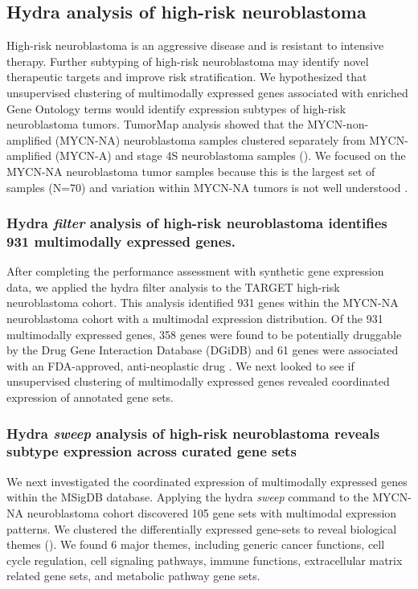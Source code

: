 \documentclass[10pt,letterpaper]{article}
\begin{document}
\subsection*{Hydra analysis of high-risk neuroblastoma}
High-risk neuroblastoma is an aggressive disease and is resistant to intensive therapy. Further subtyping of high-risk neuroblastoma may identify novel therapeutic targets and improve risk stratification. We hypothesized that unsupervised clustering of multimodally expressed genes associated with enriched Gene Ontology terms would identify expression subtypes of high-risk neuroblastoma tumors. TumorMap  analysis \cite{newtonTumorMapExploringMolecular2017} showed that the MYCN-non-amplified (MYCN-NA) neuroblastoma samples clustered separately from MYCN-amplified (MYCN-A) and stage 4S neuroblastoma samples (). We focused on the MYCN-NA neuroblastoma tumor samples because this is the largest set of samples (N=70) and variation within MYCN-NA tumors is not well understood \cite{morgensternChallengeDefiningUltrahighrisk2019}.

\subsubsection*{Hydra \textit{filter} analysis of high-risk neuroblastoma identifies 931 multimodally expressed genes.}
After completing the performance assessment with synthetic gene expression data, we applied the hydra filter analysis to the TARGET high-risk neuroblastoma cohort. This analysis identified 931 genes within the MYCN-NA neuroblastoma cohort with a multimodal expression distribution. Of the 931 multimodally expressed genes, 358 genes were found to be potentially druggable by the Drug Gene Interaction Database (DGiDB) and 61 genes were associated with an FDA-approved, anti-neoplastic drug  \cite{cotto2017dgidb}. We next looked to see if unsupervised clustering of multimodally expressed genes revealed coordinated expression of annotated gene sets.

\subsubsection*{Hydra \textit{sweep} analysis of high-risk neuroblastoma reveals subtype expression across curated gene sets}
We next investigated the coordinated expression of multimodally expressed genes within the MSigDB database. Applying the hydra \textit{sweep} command to the MYCN-NA neuroblastoma cohort discovered 105 gene sets with multimodal expression patterns. We clustered the differentially expressed gene-sets to reveal biological themes (). We found 6 major themes, including generic cancer functions, cell cycle regulation, cell signaling pathways, immune functions, extracellular matrix related gene sets, and metabolic pathway gene sets.
\end{document}
